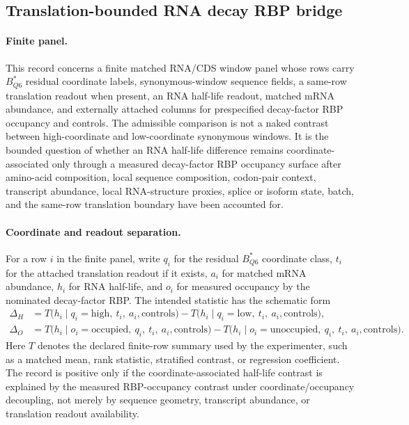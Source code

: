 \subsection{Translation-bounded RNA decay RBP bridge}\label{sec:q6-translation-bounded-rna-decay-rbp-bridge-cross-layer}

\paragraph{Finite panel.}
This record concerns a finite matched RNA/CDS window panel whose rows carry $B^{*}_{Q6}$ residual coordinate labels, synonymous-window sequence fields, a same-row translation readout when present, an RNA half-life readout, matched mRNA abundance, and externally attached columns for prespecified decay-factor RBP occupancy and controls. The admissible comparison is not a naked contrast between high-coordinate and low-coordinate synonymous windows. It is the bounded question of whether an RNA half-life difference remains coordinate-associated only through a measured decay-factor RBP occupancy surface after amino-acid composition, local sequence composition, codon-pair context, transcript abundance, local RNA-structure proxies, splice or isoform state, batch, and the same-row translation boundary have been accounted for.

\paragraph{Coordinate and readout separation.}
For a row $i$ in the finite panel, write $q_i$ for the residual $B^{*}_{Q6}$ coordinate class, $t_i$ for the attached translation readout if it exists, $a_i$ for matched mRNA abundance, $h_i$ for RNA half-life, and $o_i$ for measured occupancy by the nominated decay-factor RBP. The intended statistic has the schematic form
$$
\begin{aligned}
\Delta_{H} &= T\bigl(h_i \mid q_i = \mathrm{high},\ t_i,\ a_i,\mathrm{controls}\bigr)
        - T\bigl(h_i \mid q_i = \mathrm{low},\ t_i,\ a_i,\mathrm{controls}\bigr),\\
\Delta_{O} &= T\bigl(h_i \mid o_i = \mathrm{occupied},\ q_i,\ t_i,\ a_i,\mathrm{controls}\bigr)
        - T\bigl(h_i \mid o_i = \mathrm{unoccupied},\ q_i,\ t_i,\ a_i,\mathrm{controls}\bigr).
\end{aligned}
$$
Here $T$ denotes the declared finite-row summary used by the experimenter, such as a matched mean, rank statistic, stratified contrast, or regression coefficient. The record is positive only if the coordinate-associated half-life contrast is explained by the measured RBP-occupancy contrast under coordinate/occupancy decoupling, not merely by sequence geometry, transcript abundance, or translation readout availability.

